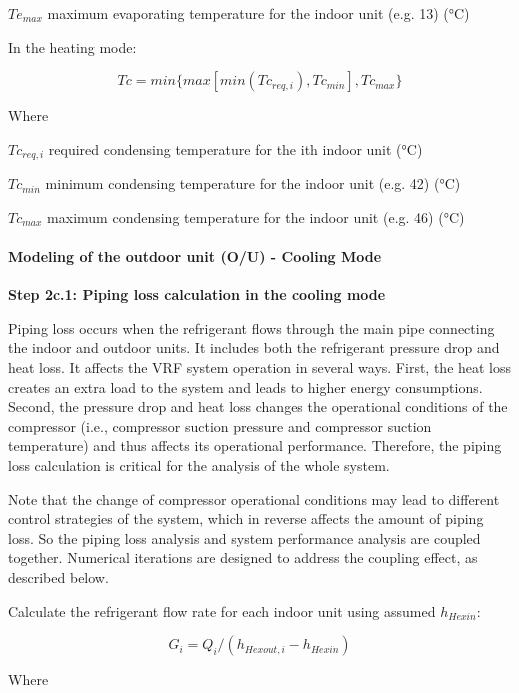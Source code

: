 $Te_{max}$ maximum evaporating temperature for the indoor unit (e.g. 13) (°C)

In the heating mode:

\begin{equation}
  Tc = min \{ max[min(Tc_{req,i}),Tc_{min}],Tc_{max} \}
\end{equation}
 
Where

$Tc_{req,i}$ required condensing temperature for the ith indoor unit (°C)

$Tc_{min}$ minimum condensing temperature for the indoor unit (e.g. 42) (°C)

$Tc_{max}$ maximum condensing temperature for the indoor unit (e.g. 46) (°C)

\paragraph{Modeling of the outdoor unit (O/U) - Cooling Mode}\label{modeling-of-the-outdoor-unit-ou-cooling-mode}

\textbf{Step 2c.1: Piping loss calculation in the cooling mode} 

Piping loss occurs when the refrigerant flows through the main pipe connecting the indoor and outdoor units. It includes both the refrigerant pressure drop and heat loss. It affects the VRF system operation in several ways. First, the heat loss creates an extra load to the system and leads to higher energy consumptions. Second, the pressure drop and heat loss changes the operational conditions of the compressor (i.e., compressor suction pressure and compressor suction temperature) and thus affects its operational performance. Therefore, the piping loss calculation is critical for the analysis of the whole system.

Note that the change of compressor operational conditions may lead to different control strategies of the system, which in reverse affects the amount of piping loss. So the piping loss analysis and system performance analysis are coupled together. Numerical iterations are designed to address the coupling effect, as described below.

Calculate the refrigerant flow rate for each indoor unit using assumed $h_{Hexin}$:

\begin{equation}
  G_i=Q_i/(h_{Hexout,i}-h_{Hexin})
\end{equation}

Where

